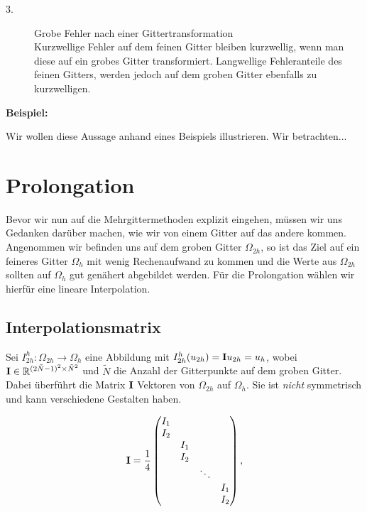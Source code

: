\begin{description}

\item[3.] Grobe Fehler nach einer Gittertransformation \\
Kurzwellige Fehler auf dem feinen Gitter bleiben kurzwellig, wenn man diese auf ein grobes Gitter transformiert. Langwellige Fehleranteile des feinen Gitters, werden jedoch auf dem groben Gitter ebenfalls zu kurzwelligen.

\end{description}

\textbf{Beispiel:}

Wir wollen diese Aussage anhand eines Beispiels illustrieren. Wir betrachten...

\section{Prolongation}

Bevor wir nun auf die Mehrgittermethoden explizit eingehen, müssen wir uns Gedanken darüber machen, wie wir von einem Gitter auf das andere kommen. Angenommen wir befinden uns auf dem groben Gitter $\Omega_{2h}$, so ist das Ziel auf ein feineres Gitter $\Omega_{h}$ mit wenig Rechenaufwand zu kommen und die Werte aus $\Omega_{2h}$ sollten auf $\Omega_{h}$ gut genähert abgebildet werden. Für die Prolongation wählen wir hierfür eine lineare Interpolation.

\subsection{Interpolationsmatrix}

Sei $I^{h}_{2h}: \Omega_{2h} \longrightarrow \Omega_{h}$ eine Abbildung mit $I_{2h}^{h}(u_{2h}) = {\textbf{I}}u_{2h} = u_{h}$, wobei ${\textbf{I}} \in \mathbb{R}^{(2 \tilde N - 1)^{2} \times \tilde N^{2}}$ und $\tilde N$ die Anzahl der Gitterpunkte auf dem groben Gitter. Dabei überführt die Matrix ${\textbf{I}}$ Vektoren von $\Omega_{2h}$ auf $\Omega_{h}$. Sie ist \textit{nicht} symmetrisch und kann verschiedene Gestalten haben.

\begin{equation}
{\textbf{I}} = \frac {1} {4}
\begin{pmatrix}
I_{1} & & &\\
I_{2} & & &\\
& I_{1} & &\\
& I_{2} & &\\
& & \ddots &\\
& & & I_{1}\\
& & & I_{2}
\end{pmatrix},
\end{equation}

